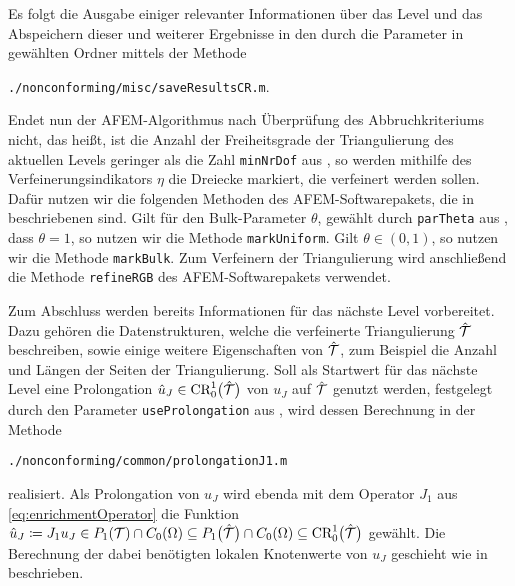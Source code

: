 Es folgt die Ausgabe einiger relevanter Informationen über das Level und das
Abspeichern dieser und weiterer Ergebnisse in den durch die Parameter in
 gewählten Ordner mittels der Methode
\begin{center}
  \texttt{./nonconforming/misc/saveResultsCR.m}.
\end{center}
Endet nun der AFEM-Algorithmus nach Überprüfung des Abbruchkriteriums nicht,
das heißt, ist die Anzahl der Freiheitsgrade der Triangulierung des aktuellen
Levels geringer als die Zahl \texttt{minNrDof} aus , so
werden mithilfe des Verfeinerungsindikators $\eta$ die Dreiecke markiert, die
verfeinert werden sollen. 
Dafür nutzen wir die folgenden Methoden des AFEM-Softwarepakets, die in
\cite[Abschnitt 1.6]{CGKNRR10} beschriebenen sind.
Gilt für den Bulk-Parameter $\theta$, gewählt durch \texttt{parTheta} aus
, dass $\theta=1$, so nutzen
wir die Methode \texttt{markUniform}. Gilt $\theta\in(0,1)$, so nutzen wir
die Methode \texttt{markBulk}.
Zum Verfeinern der Triangulierung wird anschließend die Methode
\texttt{refineRGB} \cite[1.7.2]{CGKNRR10} des AFEM-Softwarepakets verwendet.

Zum Abschluss werden bereits Informationen für das nächste Level vorbereitet. 
Dazu gehören die Datenstrukturen, welche die verfeinerte Triangulierung
$\hat{\mathcal{T}}$ beschreiben, sowie einige weitere Eigenschaften von
$\hat{\mathcal{T}}$, zum Beispiel die Anzahl und Längen der Seiten der Triangulierung.
Soll als Startwert für das nächste Level eine Prolongation $\hat
u_J\in\textup{CR}^1_0\big(\hat{\mathcal{T}}\big)$ von $u_J$ auf $\hat{\mathcal{T}}$ genutzt werden,
festgelegt durch den Parameter \texttt{useProlongation} aus
, wird dessen Berechnung in der Methode
\begin{center}
  \texttt{./nonconforming/common/prolongationJ1.m}
\end{center}
realisiert. 
Als Prolongation von $u_J$ wird ebenda mit dem Operator $J_1$ aus
\eqref{eq:enrichmentOperator} die Funktion $\hat u_J\coloneqq J_1 u_J\in
P_1(\mathcal{T})\cap C_0(\Omega)\subseteq P_1\big(\hat{\mathcal{T}}\big)\cap C_0(\Omega)
\subseteq \textup{CR}^1_0\big(\hat{\mathcal{T}}\big)$ gewählt.
Die Berechnung der dabei benötigten lokalen Knotenwerte von $u_J$ geschieht
wie in  beschrieben.

